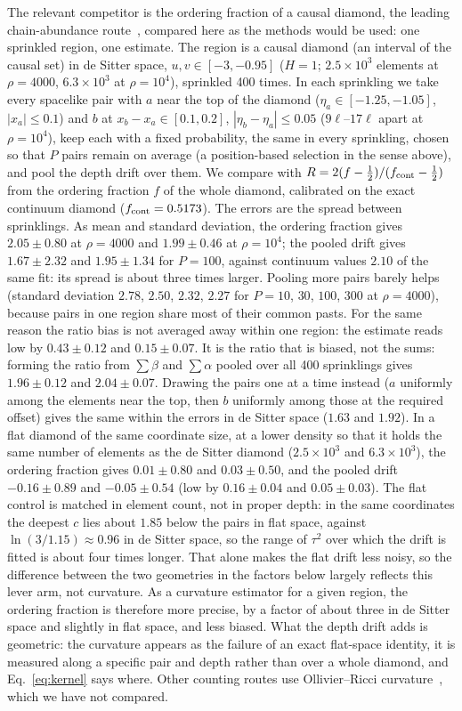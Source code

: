 \documentclass[prd,twocolumn,superscriptaddress,nofootinbib,amsmath,amssymb,floatfix]{revtex4-2}
\begin{document}
The relevant competitor is the ordering fraction of a causal diamond, the leading chain-abundance route~\cite{RSS13}, compared here as the methods would be used: one sprinkled region, one estimate. The region is a causal diamond (an interval of the causal set) in de Sitter space, $u,v\in[-3,-0.95]$ ($H=1$; $2.5\times10^3$ elements at $\rho=4000$, $6.3\times10^3$ at $\rho=10^4$), sprinkled 400 times. In each sprinkling we take every spacelike pair with $a$ near the top of the diamond ($\eta_a\in[-1.25,-1.05]$, $|x_a|\leq0.1$) and $b$ at $x_b-x_a\in[0.1,0.2]$, $|\eta_b-\eta_a|\leq0.05$ ($9\ell$--$17\ell$ apart at $\rho=10^4$), keep each with a fixed probability, the same in every sprinkling, chosen so that $P$ pairs remain on average (a position-based selection in the sense above), and pool the depth drift over them. We compare with $R=2(f-\tfrac12)/(f_{\rm cont}-\tfrac12)$ from the ordering fraction $f$ of the whole diamond, calibrated on the exact continuum diamond ($f_{\rm cont}=0.5173$). The errors are the spread between sprinklings. As mean and standard deviation, the ordering fraction gives $2.05\pm0.80$ at $\rho=4000$ and $1.99\pm0.46$ at $\rho=10^4$; the pooled drift gives $1.67\pm2.32$ and $1.95\pm1.34$ for $P=100$, against continuum values $2.10$ of the same fit: its spread is about three times larger. Pooling more pairs barely helps (standard deviation $2.78$, $2.50$, $2.32$, $2.27$ for $P=10$, $30$, $100$, $300$ at $\rho=4000$), because pairs in one region share most of their common pasts. For the same reason the ratio bias is not averaged away within one region: the estimate reads low by $0.43\pm0.12$ and $0.15\pm0.07$. It is the ratio that is biased, not the sums: forming the ratio from $\sum\beta$ and $\sum\alpha$ pooled over all 400 sprinklings gives $1.96\pm0.12$ and $2.04\pm0.07$. Drawing the pairs one at a time instead ($a$ uniformly among the elements near the top, then $b$ uniformly among those at the required offset) gives the same within the errors in de Sitter space ($1.63$ and $1.92$). In a flat diamond of the same coordinate size, at a lower density so that it holds the same number of elements as the de Sitter diamond ($2.5\times10^3$ and $6.3\times10^3$), the ordering fraction gives $0.01\pm0.80$ and $0.03\pm0.50$, and the pooled drift $-0.16\pm0.89$ and $-0.05\pm0.54$ (low by $0.16\pm0.04$ and $0.05\pm0.03$). The flat control is matched in element count, not in proper depth: in the same coordinates the deepest $c$ lies about $1.85$ below the pairs in flat space, against $\ln(3/1.15)\approx0.96$ in de Sitter space, so the range of $\tau^2$ over which the drift is fitted is about four times longer. That alone makes the flat drift less noisy, so the difference between the two geometries in the factors below largely reflects this lever arm, not curvature. As a curvature estimator for a given region, the ordering fraction is therefore more precise, by a factor of about three in de Sitter space and slightly in flat space, and less biased. What the depth drift adds is geometric: the curvature appears as the failure of an exact flat-space identity, it is measured along a specific pair and depth rather than over a whole diamond, and Eq.~\eqref{eq:kernel} says where. Other counting routes use Ollivier--Ricci curvature~\cite{BBR26}, which we have not compared.
\end{document}
